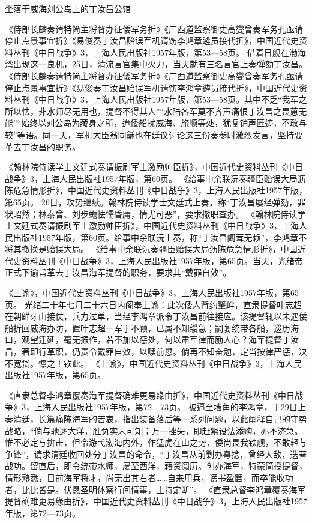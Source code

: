 \documentclass[12pt,UTF8]{ctexbook}
\begin{document}
坐落于威海刘公岛上的丁汝昌公馆

《侍郎长麟奏请特简主将督办征倭军务折》《广西道监察御史高燮曾奏军务孔亟请停止点景事宜折》《易俊奏丁汝昌贻误军机请饬李鸿章遴员接代折》，中国近代史资料丛刊《中日战争》3，上海人民出版社1957年版，第53—58页。
借着日舰在渤海湾出现这一良机，25日，清流言官集中火力，当天就有三名言官上奏弹劾丁汝昌。 《侍郎长麟奏请特简主将督办征倭军务折》《广西道监察御史高燮曾奏军务孔亟请停止点景事宜折》《易俊奏丁汝昌贻误军机请饬李鸿章遴员接代折》，中国近代史资料丛刊《中日战争》3，上海人民出版社1957年版，第53—58页。其中不乏“我军之所以怯，非水师尽无用也，提督不得其人”“水陆各军莫不齐声痛恨丁汝昌之畏葸无能”“始终以刘公岛为藏身之所，迨倭船扰威海、旅顺等处，犹复销声匿迹，不敢与较”等语。同一天，军机大臣翁同龢也在廷议讨论这三份奏参时激烈发言，坚持要革去丁汝昌的职务。

《翰林院侍读学士文廷式奏请振刷军士激励帅臣折》，中国近代史资料丛刊《中日战争》3，上海人民出版社1957年版，第60页。
《给事中余联沅奏疆臣贻误大局沥陈危急情形折》，中国近代史资料丛刊《中日战争》3，上海人民出版社1957年版，第65页。
26日，攻势继续。翰林院侍读学士文廷式上奏，称“丁汝昌屡经弹劾，罪状昭然；林泰曾、刘步蟾怯懦昏庸，情尤可恶”，要求撤职查办。 《翰林院侍读学士文廷式奏请振刷军士激励帅臣折》，中国近代史资料丛刊《中日战争》3，上海人民出版社1957年版，第60页。给事中余联沅上奏，称“丁汝昌阘茸无赖”，李鸿章不将其撤换是贻误大局。 《给事中余联沅奏疆臣贻误大局沥陈危急情形折》，中国近代史资料丛刊《中日战争》3，上海人民出版社1957年版，第65页。当天，光绪帝正式下谕旨革去丁汝昌海军提督的职务，要求其“戴罪自效”。

《上谕》，中国近代史资料丛刊《中日战争》3，上海人民出版社1957年版，第65页。
光绪二十年七月二十六日内阁奉上谕：此次倭人背约肇衅，直隶提督叶志超在朝鲜牙山接仗，兵力过单，当经李鸿章派令丁汝昌前往接应。该提督辄以未遇倭船折回威海办防，置叶志超一军于不顾，已属不知缓急；嗣复统带各船，巡历海口，观望迁延，毫无振作，若不加以惩处，何以肃军律而励人心？海军提督丁汝昌，著即行革职，仍责令戴罪自效，以赎前愆。倘再不知奋勉，定当按律严惩，决不宽贷。懔之！钦此。 《上谕》，中国近代史资料丛刊《中日战争》3，上海人民出版社1957年版，第65页。

《直隶总督李鸿章覆奏海军提督确难更易缘由折》，中国近代史资料丛刊《中日战争》3，上海人民出版社1957年版，第72—73页。
被逼至墙角的李鸿章，于29日上奏清廷，长篇痛陈海军的苦衷，指出装备落后等一系列问题，以此阐释自己的守势战略，“倘与驰逐大洋，胜负实未可知；万一挫失，即赶紧设法添购，亦不济急。惟不必定与拚击，但令游弋渤海内外，作猛虎在山之势，倭尚畏我铁舰，不敢轻与争锋”，请求清廷收回处分丁汝昌的命令，“丁汝昌从前剿办粤捻，曾经大敌，迭著战功。留直后，即令统带水师，屡至西洋，藉资阅历。创办海军，特蒙简授提督，情形熟悉，目前海军将才，尚无出其右者……自来用兵，谤书盈箧，而卒能收功者，比比皆是。伏恳圣明体察行间情事，主持定断”。 《直隶总督李鸿章覆奏海军提督确难更易缘由折》，中国近代史资料丛刊《中日战争》3，上海人民出版社1957年版，第72—73页。
\end{document}
